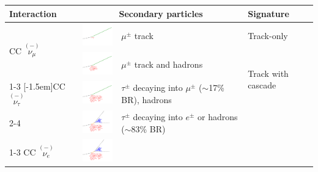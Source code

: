 \begin{table}[h]
    \small
    \begin{center}
        \begin{tabular}{  m{2.3cm} m{2.3cm} m{4.5cm} m{3.5cm}  } 
            \hline\hline
            \textbf{Interaction} & \multicolumn{2}{c}{\textbf{Secondary particles}} &\textbf{Signature} \\ 
            \hline\hline
            \multirow{2}{*}[-1.5em]{CC $\overset{\scriptscriptstyle(-)}{\nu_\mu}$ }
            & \includegraphics[width=2cm]{figures/numu_CC_muon_only.pdf} 
            & $\mu^\pm$ track 
            & Track-only  \\
            \cmidrule{2-4} 
            &\includegraphics[width=2cm]{figures/numu_CC_track_cascade.pdf}  
            & $\mu^\pm$ track and hadrons 
            & \multirow{2}{*}[-2em]{Track with cascade} \\
            \cmidrule{1-3}
            \multirow{2}{*}[-1.5em]{CC $\overset{\scriptscriptstyle(-)}{\nu_\tau}$ }
            &\includegraphics[width=2cm]{figures/nutau_CC_track_cascade.pdf} 
            & $\tau^\pm$ decaying into $\mu^\pm$ ($\sim$17\% BR), hadrons 
            & {}\\
            \cmidrule{2-4}
            & \includegraphics[width=2cm]{figures/nutau_CC_cascadeonly.pdf}
            & $\tau^\pm$ decaying into $e^\pm$ or hadrons ($\sim$83\% BR)  
            & {}\\
            \cmidrule{1-3} CC $\overset{\scriptscriptstyle(-)}{\nu_e}$ 
            & \includegraphics[width=2cm]{figures/nue_CC_cascadeonly.pdf}

\end{tabular}
\end{center}
\end{table}
